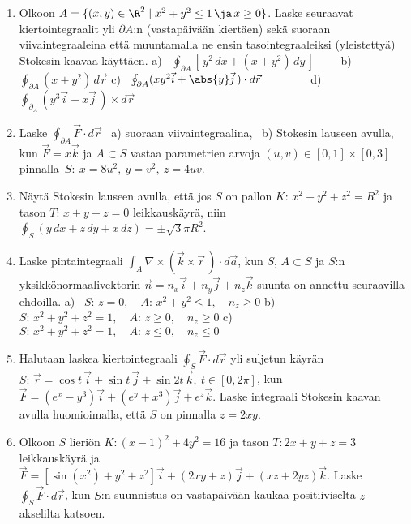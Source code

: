 \Harj
\begin{enumerate}

\item 
Olkoon $A=\{(x,y)\in \R^2 \mid x^2+y^2 \le 1\,\ja\,x \ge 0\}$. Laske seuraavat kiertointegraalit
yli $\partial A$:n (vastapäivään kiertäen) sekä suoraan viivaintegraaleina että muuntamalla ne
ensin tasointegraaleiksi (yleistettyä) Stokesin kaavaa käyttäen. \vspace{1mm}\newline
a) \ $\oint_{\partial A} \left[\,y^2\,dx+(x+y^2)\,dy\,\right] \qquad$
b) \ $\oint_{\partial A} (x+y^2)\,d\vec r$ \newline
c) \ $\oint_{\partial A} (xy^2\vec i+\abs{y}\vec j\,) \cdot d\vec r \qquad\qquad$
d) \ $\oint_{\partial_A} (y^3\vec i-x\vec j\,) \times d\vec r$

\item 
Laske $\oint_{\partial A} \vec F\cdot d\vec r$ \ a) suoraan viivaintegraalina, \  
b) Stokesin lauseen avulla, kun $\vec F=x\vec k$ ja $A \subset S$ vastaa 
parametrien arvoja $(u,v)\in [0,1]\times[0,3]$ pinnalla $\,S:\ x=8u^2,\ y=v^2,\ z=4uv$.

\item
Näytä Stokesin lauseen avulla, että jos $S$ on pallon $K:\,x^2+y^2+z^2=R^2$ ja tason 
$T:\,x+y+z=0$ leikkauskäyrä, niin $\oint_S (y\,dx+z\,dy+x\,dz)=\pm\sqrt{3}\pi R^2$.

\item
Laske pintaintegraali $\int_A \nabla\times(\vec k\times\vec r\,) \cdot d\vec a$, kun $S$, 
$A \subset S$ ja $S$:n yksikkönormaalivektorin $\vec n=n_x\vec i+n_y\vec j+n_z\vec k$
suunta on annettu seuraavilla ehdoilla. \vspace{1mm}\newline
a) \ $S:\,z=0, \quad A:\,x^2+y^2 \le 1, \quad n_z \ge 0$ \newline
b) \ $S:\,x^2+y^2+z^2=1, \quad A:\,z \ge 0, \quad n_z \ge 0$ \newline
c) \ $S:\,x^2+y^2+z^2=1, \quad A:\,z \le 0, \quad n_z \le 0$

\item
Halutaan laskea kiertointegraali $\oint_S \vec F \cdot d\vec r$ yli suljetun käyrän
$S:\,\vec r=\cos t\,\vec i+\sin t\,\vec j+\sin 2t\,\vec k,\ t\in[0,2\pi]$, kun
$\vec F=(e^x-y^3)\vec i+(e^y+x^3)\vec j+e^z\vec k$. Laske integraali Stokesin kaavan avulla
huomioimalla, että $S$ on pinnalla $z=2xy$.

\item
Olkoon $S$ lieriön $K:(x-1)^2+4y^2=16$ ja tason $T:2x+y+z=3$ \linebreak leikkauskäyrä ja
$\vec F=[\sin(x^2)+y^2+z^2]\vec i+(2xy+z)\vec j+(xz+2yz)\vec k$. Laske \linebreak
$\oint_S \vec F \cdot d\vec r$, kun $S$:n suunnistus on vastapäivään kaukaa positiiviselta
$z$-akselilta katsoen.


\end{enumerate}
